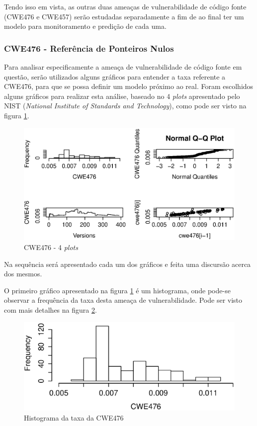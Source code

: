 Tendo isso em vista, as outras duas ameaças de vulnerabilidade de código fonte
(CWE476 e CWE457) serão estudadas separadamente a fim de ao final ter um modelo
para monitoramento e predição de cada uma.


\subsubsection{CWE476 - Referência de Ponteiros Nulos}\label{eda:cwe476}

Para analisar especificamente a ameaça de vulnerabilidade de código fonte em
questão, serão utilizados alguns gráficos para entender a taxa referente a
CWE476, para que se possa definir um modelo próximo ao real. Foram escolhidos
alguns gráficos para realizar esta análise, baseado no 4 \textit{plots}
apresentado pelo NIST (\textit{National Institute of Standards and Technology}),
como pode ser visto na figura \ref{fig:cwe476-4-plot}.

\begin{figure}[h]
  \centering
  \includegraphics[width=1.0\textwidth]
      {figuras/cwe476-4-plot.eps}
      \caption{CWE476 - 4 \textit{plots}}
  \label{fig:cwe476-4-plot}
\end{figure}

Na sequência será apresentado cada um dos gráficos e feita uma discursão acerca
dos mesmos.

O primeiro gráfico apresentado na figura \ref{fig:cwe476-4-plot} é um
histograma, onde pode-se observar a frequência da taxa desta ameaça de
vulnerabilidade. Pode ser visto com mais detalhes na figura
\ref{fig:cwe476-hist}.

\begin{figure}[h]
  \centering
  \includegraphics[width=1.0\textwidth]
      {figuras/cwe476-hist.eps}
      \caption{Histograma da taxa da CWE476}
      \label{fig:cwe476-hist}
\end{figure}

